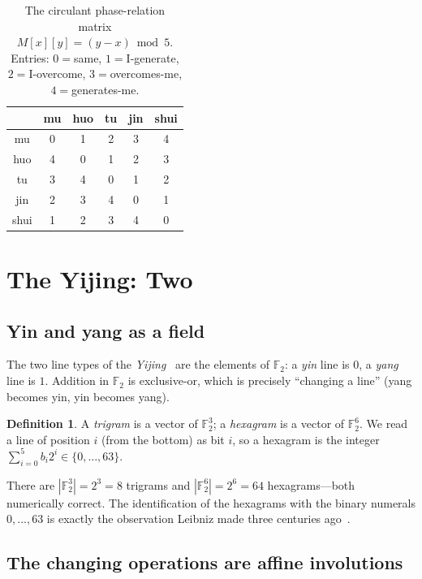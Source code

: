\documentclass[11pt,a4paper]{article}
\theoremstyle{definition}
\newtheorem{definition}[theorem]{Definition}
\theoremstyle{remark}
\newcommand{\F}{\mathbb{F}}
\begin{document}
\begin{table}[h]\centering
\caption{The circulant phase-relation matrix $M[x][y]=(y-x)\bmod 5$. Entries: $0=$same, $1=$I-generate, $2=$I-overcome, $3=$overcomes-me, $4=$generates-me.\label{tab:relmatrix}}
\small
\begin{tabular}{c|ccccc}
 & mu & huo & tu & jin & shui\\ \hline
mu  & 0 & 1 & 2 & 3 & 4\\
huo & 4 & 0 & 1 & 2 & 3\\
tu  & 3 & 4 & 0 & 1 & 2\\
jin & 2 & 3 & 4 & 0 & 1\\
shui& 1 & 2 & 3 & 4 & 0
\end{tabular}
\end{table}

\section{The Yijing: Two}\label{sec:yijing}

\subsection{Yin and yang as a field}
The two line types of the \emph{Yijing}~\cite{zhouyi} are the elements of $\F_2$: a \emph{yin} line is $0$, a \emph{yang} line is $1$. Addition in $\F_2$ is exclusive-or, which is precisely ``changing a line'' (yang becomes yin, yin becomes yang).

\begin{definition}
A \emph{trigram} is a vector of $\F_2^3$; a \emph{hexagram} is a vector of $\F_2^6$. We read a line of position $i$ (from the bottom) as bit $i$, so a hexagram is the integer $\sum_{i=0}^{5} b_i 2^i\in\{0,\dots,63\}$.
\end{definition}

There are $|\F_2^3|=2^3=8$ trigrams and $|\F_2^6|=2^6=64$ hexagrams---both numerically correct. The identification of the hexagrams with the binary numerals $0,\dots,63$ is exactly the observation Leibniz made three centuries ago~\cite{leibniz1703}.

\subsection{The changing operations are affine involutions}
\end{document}
